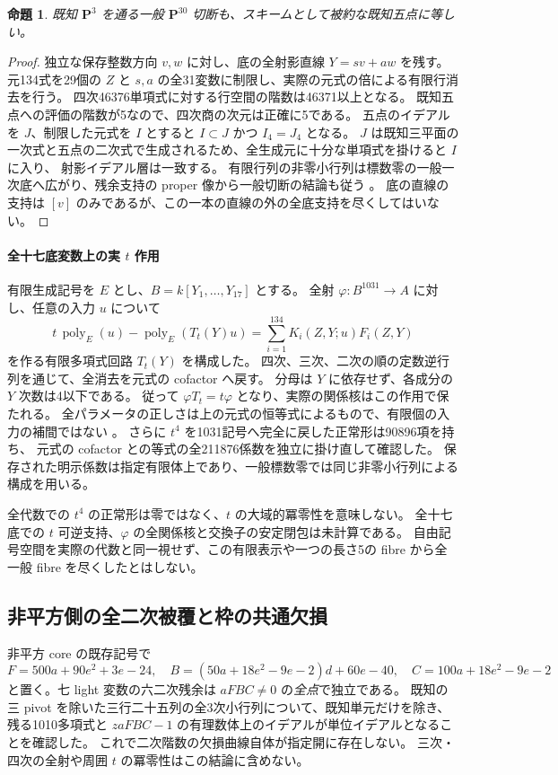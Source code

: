 \documentclass[11pt,a4paper]{ltjsarticle}
\newcommand{\PP}{\mathbf P}
\newtheorem{proposition}[theorem]{命題}
\theoremstyle{remark}
\begin{document}
\begin{proposition}
既知 $\PP^3$ を通る一般 $\PP^{30}$ 切断も、スキームとして被約な既知五点に等しい。
\end{proposition}
\begin{proof}
独立な保存整数方向 $v,w$ に対し、底の全射影直線 $Y=sv+aw$ を残す。
元134式を29個の $Z$ と $s,a$ の全31変数に制限し、実際の元式の倍による有限行消去を行う。
四次46376単項式に対する行空間の階数は46371以上となる。
既知五点への評価の階数が5なので、四次商の次元は正確に5である。
五点のイデアルを $J$、制限した元式を $I$ とすると $I\subset J$ かつ $I_4=J_4$ となる。
$J$ は既知三平面の一次式と五点の二次式で生成されるため、全生成元に十分な単項式を掛けると $I$ に入り、
射影イデアル層は一致する。
有限行列の非零小行列は標数零の一般一次底へ広がり、残余支持の proper 像から一般切断の結論も従う
\cite{p30-section-v62}。
底の直線の支持は $[v]$ のみであるが、この一本の直線の外の全底支持を尽くしてはいない。
\end{proof}

\paragraph{全十七底変数上の実 $t$ 作用}
有限生成記号を $E$ とし、$B=k[Y_1,\ldots,Y_{17}]$ とする。
全射 $\varphi:B^{1031}\to A$ に対し、任意の入力 $u$ について
\[
 t\,\operatorname{poly}_E(u)-\operatorname{poly}_E(T_t(Y)u)
      =\sum_{i=1}^{134}K_i(Z,Y;u)F_i(Z,Y)
\]
を作る有限多項式回路 $T_t(Y)$ を構成した。
四次、三次、二次の順の定数逆行列を通じて、全消去を元式の cofactor へ戻す。
分母は $Y$ に依存せず、各成分の $Y$ 次数は4以下である。
従って $\varphi T_t=t\varphi$ となり、実際の関係核はこの作用で保たれる。
全パラメータの正しさは上の元式の恒等式によるもので、有限個の入力の補間ではない
\cite{t-action-v62}。
さらに $t^4$ を1031記号へ完全に戻した正常形は90896項を持ち、
元式の cofactor との等式の全211876係数を独立に掛け直して確認した。
保存された明示係数は指定有限体上であり、一般標数零では同じ非零小行列による構成を用いる。

全代数での $t^4$ の正常形は零ではなく、$t$ の大域的冪零性を意味しない。
全十七底での $t$ 可逆支持、$\varphi$ の全関係核と交換子の安定閉包は未計算である。
自由記号空間を実際の代数と同一視せず、この有限表示や一つの長さ5の fibre から全一般 fibre を尽くしたとはしない。

\subsection{非平方側の全二次被覆と枠の共通欠損}
非平方 core の既存記号で
\[
 F=500a+90e^2+3e-24,\quad
 B=(50a+18e^2-9e-2)d+60e-40,\quad C=100a+18e^2-9e-2
\]
と置く。七 light 変数の六二次残余は $aFBC\ne0$ の\emph{全点}で独立である。
既知の三 pivot を除いた三行二十五列の全3次小行列について、既知単元だけを除き、
残る1010多項式と $zaFBC-1$ の有理数体上のイデアルが単位イデアルとなることを確認した。
これで二次階数の欠損曲線自体が指定開に存在しない\cite{nonsquare-cover-v62}。
三次・四次の全射や周囲 $t$ の冪零性はこの結論に含めない。
\end{document}
